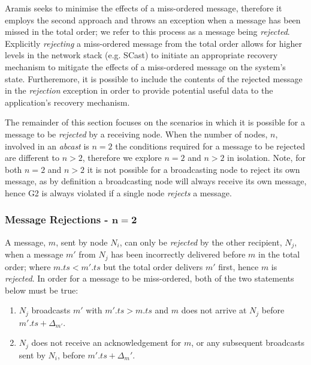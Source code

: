         \textsf{Aramis} seeks to minimise the effects of a miss-ordered message, therefore it employs the second approach and throws an exception when a message has been missed in the total order; we refer to this process as a message being \emph{rejected}.  Explicitly \emph{rejecting} a miss-ordered message from the total order allows for higher levels in the network stack (e.g. \textsf{SCast}) to initiate an appropriate recovery mechanism to mitigate the effects of a miss-ordered message on the system's state.  Furtheremore, it is possible to include the contents of the rejected message in the \emph{rejection} exception in order to provide potential useful data to the application's recovery mechanism.  
        
        The remainder of this section focuses on the scenarios in which it is possible for a message to be \emph{rejected} by a receiving node.  When the number of nodes, $n$, involved in an \emph{abcast} is $n=2$ the conditions required for a message to be rejected are different to $n > 2$, therefore we explore $n=2$ and $n>2$ in isolation. Note, for both $n=2$ and $n>2$ it is not possible for a broadcasting node to reject its own message, as by definition a broadcasting node will always receive its own message, hence G2 is always violated if a single node \emph{rejects} a message.  
        
        \subsubsection*{Message Rejections - $\boldsymbol{n = 2}$}
        A message, $m$, sent by node $N_i$, can only be \emph{rejected} by the other recipient, $N_j$, when a message $m'$ from $N_j$ has been incorrectly delivered before $m$ in the total order; where $m.ts < m'.ts$ but the total order delivers $m'$ first, hence $m$ is \emph{rejected}.  In order for a message to be miss-ordered, both of the two statements below must be true:
        
        \begin{enumerate}
            \item $N_j$ broadcasts $m'$ with $m'.ts > m.ts$ and $m$ does not arrive at $N_j$ before $m'.ts + \Delta_{m'}$.  
            \item $N_j$ does not receive an acknowledgement for $m$, or any subsequent broadcasts sent by $N_i$, before $m'.ts + \Delta_m'$.   
        \end{enumerate}
        
